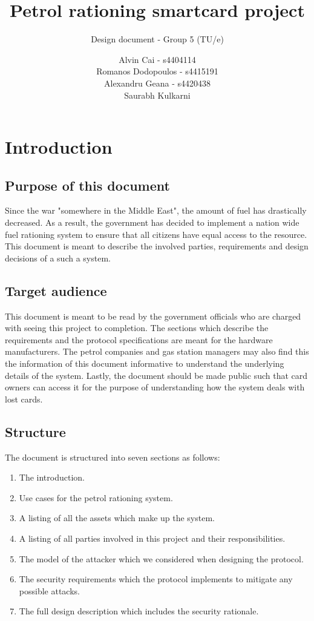 \documentclass[a4paper,10pt]{llncs}
\title{Petrol rationing smartcard project}
\subtitle{Design document - Group 5 (TU/e)}
\author{Alvin Cai - s4404114 \\ Romanos Dodopoulos - s4415191 \\ Alexandru Geana - s4420438 \\ Saurabh Kulkarni}
\institute{}
\begin{document}
\maketitle

\section{Introduction}
\subsection{Purpose of this document}

Since the war "somewhere in the Middle East", the amount of fuel has drastically decreased. As a result, the government has decided to implement a nation wide fuel rationing system to ensure that all citizens have equal access to the resource. This document is meant to describe the involved parties, requirements and design decisions of a such a system. 

\subsection{Target audience}

This document is meant to be read by the government officials who are charged with seeing this project to completion. The sections which describe the requirements and the protocol specifications are meant for the hardware manufacturers. The petrol companies and gas station managers may also find this the information of this document informative to understand the underlying details of the system. Lastly, the document should be made public such that card owners can access it for the purpose of understanding how the system deals with lost cards.

\subsection{Structure}

The document is structured into seven sections as follows:
\begin{enumerate}
  \item The introduction.
  \item Use cases for the petrol rationing system.
  \item A listing of all the assets which make up the system.
  \item A listing of all parties involved in this project and their responsibilities.
  \item The model of the attacker which we considered when designing the protocol.
  \item The security requirements which the protocol implements to mitigate any possible attacks.
  \item The full design description which includes the security rationale.
\end{enumerate}
\end{document}
